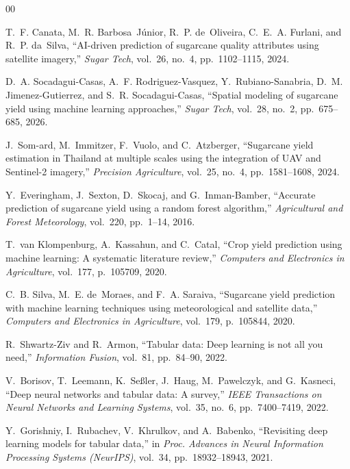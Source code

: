 \documentclass[conference,10pt,letterpaper]{IEEEtran}
\begin{document}
\begin{thebibliography}{00}

T.~F. Canata, M.~R. Barbosa~J{\'u}nior, R.~P. de~Oliveira, C.~E.~A. Furlani,
and R.~P. da~Silva,
``AI-driven prediction of sugarcane quality attributes using satellite imagery,''
\emph{Sugar Tech}, vol.~26, no.~4, pp.~1102--1115, 2024.

D.~A. Socadagui-Casas, A.~F. Rodriguez-Vasquez, Y.~Rubiano-Sanabria,
D.~M. Jimenez-Gutierrez, and S.~R. Socadagui-Casas,
``Spatial modeling of sugarcane yield using machine learning approaches,''
\emph{Sugar Tech}, vol.~28, no.~2, pp.~675--685, 2026.

J.~Som-ard, M.~Immitzer, F.~Vuolo, and C.~Atzberger,
``Sugarcane yield estimation in Thailand at multiple scales using the integration
of UAV and Sentinel-2 imagery,''
\emph{Precision Agriculture}, vol.~25, no.~4, pp.~1581--1608, 2024.

Y.~Everingham, J.~Sexton, D.~Skocaj, and G.~Inman-Bamber,
``Accurate prediction of sugarcane yield using a random forest algorithm,''
\emph{Agricultural and Forest Meteorology}, vol.~220, pp.~1--14, 2016.

T.~van Klompenburg, A.~Kassahun, and C.~Catal,
``Crop yield prediction using machine learning: A systematic literature review,''
\emph{Computers and Electronics in Agriculture}, vol.~177, p.~105709, 2020.

C.~B. Silva, M.~E. de~Moraes, and F.~A. Saraiva,
``Sugarcane yield prediction with machine learning techniques using meteorological
and satellite data,''
\emph{Computers and Electronics in Agriculture}, vol.~179, p.~105844, 2020.

R.~Shwartz-Ziv and R.~Armon,
``Tabular data: Deep learning is not all you need,''
\emph{Information Fusion}, vol.~81, pp.~84--90, 2022.

V.~Borisov, T.~Leemann, K.~Se{\ss}ler, J.~Haug, M.~Pawelczyk, and G.~Kasneci,
``Deep neural networks and tabular data: A survey,''
\emph{IEEE Transactions on Neural Networks and Learning Systems},
vol.~35, no.~6, pp.~7400--7419, 2022.

Y.~Gorishniy, I.~Rubachev, V.~Khrulkov, and A.~Babenko,
``Revisiting deep learning models for tabular data,''
in \emph{Proc. Advances in Neural Information Processing Systems (NeurIPS)},
vol.~34, pp.~18932--18943, 2021.


\end{thebibliography}
\end{document}
